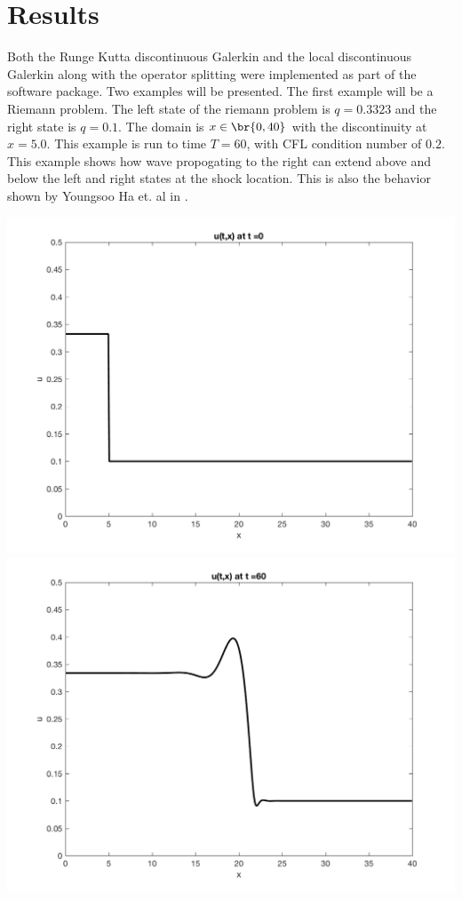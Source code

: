 \documentclass[11pt, oneside]{article}
\begin{document}
\section{Results}
  Both the Runge Kutta discontinuous Galerkin and the local discontinuous
  Galerkin along with the operator splitting were implemented as part of
  the {} software package\cite{dogpack}.
  Two examples will be presented.
  The first example will be a Riemann problem.
  The left state of the riemann problem is $q = 0.3323$ and the right state is
  $q = 0.1$.
  The domain is $x \in \br{0, 40}$ with the discontinuity at $x = 5.0$.
  This example is run to time $T = 60$, with CFL condition number of $0.2$.
  This example shows how wave propogating to the right can extend above and
  below the left and right states at the shock location.
  This is also the behavior shown by Youngsoo Ha et. al in \cite{ha2008numerical}.
  \begin{center}
    \includegraphics[scale=0.4]{Figures/reimann0.png}
    \includegraphics[scale=0.4]{Figures/reimann60.png}
  \end{center}
\end{document}

